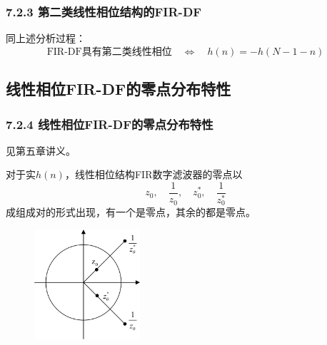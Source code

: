 \documentclass[notheorems,compress,mathserif,table]{beamer}
\begin{document}
\begin{frame}[shrink]\frametitle{7.2.3 第二类线性相位结构的FIR-DF}%
同上述分析过程：
    $$\mbox{FIR-DF具有第二类线性相位}\quad \Longleftrightarrow \quad h(n)=-h(N-1-n)$$
%
%



\end{frame}
\subsection{线性相位FIR-DF的零点分布特性}

\begin{frame}\frametitle{7.2.4 线性相位FIR-DF的零点分布特性}%
见第五章讲义。\par
对于实$h(n)$，线性相位结构FIR数字滤波器的零点以
$$z_0,\quad\frac{1}{z_0},\quad z_0^*,\quad\frac{1}{z_0^*}$$
成组成对的形式出现，有一个是零点，其余的都是零点。
\begin{figure}[h]
\centering
\includegraphics[width=0.35\textwidth]{xxxwldsyt.jpg}
\end{figure}
\end{frame}
\end{document}
